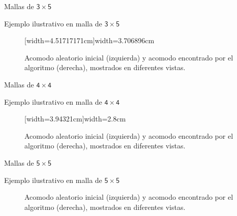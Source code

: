 \documentclass[14pt, aspectratio = 1610, xcolor=table, structureblod]{beamer}
\begin{document}
\begin{frame}{Mallas de $\mathsf{3\times 5}$}
	\vfill
	\Wider[1.85cm]{
	\begin{figure}[H]
	\end{figure}
	}%
\end{frame}

\begin{frame}{Ejemplo ilustrativo en malla de $\mathsf{3\times 5}$}
	\vskip -10pt%
	\begin{figure}[H]
		\caption{Acomodo aleatorio inicial (izquierda) y acomodo encontrado por el algoritmo (derecha), mostrados en diferentes vistas.}%
		[width=4.51717171cm]{width=3.706896cm}%
	\end{figure}%
\end{frame}


\begin{frame}{Mallas de $\mathsf{4\times 4}$}
	\vfill
	\Wider[1.85cm]{
	\begin{figure}[H]
	\end{figure}
	}%
\end{frame}

\begin{frame}{Ejemplo ilustrativo en malla de $\mathsf{4\times 4}$}
	\vskip -8pt%
	\begin{figure}[H]
		\caption{Acomodo aleatorio inicial (izquierda) y acomodo encontrado por el algoritmo (derecha), mostrados en diferentes vistas.}%
		[width=3.94321cm]{width=2.8cm}%
	\end{figure}
\end{frame}


\begin{frame}{Mallas de $\mathsf{5\times 5}$}
	\vfill
	\Wider[1.85cm]{
	\begin{figure}[H]
	\end{figure}
	}%
\end{frame}

\begin{frame}{Ejemplo ilustrativo en malla de $\mathsf{5\times 5}$}
	\vskip -7pt%
	\begin{figure}[H]
		\caption{Acomodo aleatorio inicial (izquierda) y acomodo encontrado por el algoritmo (derecha), mostrados en diferentes vistas.}%
	\end{figure}
\end{frame}
\end{document}
